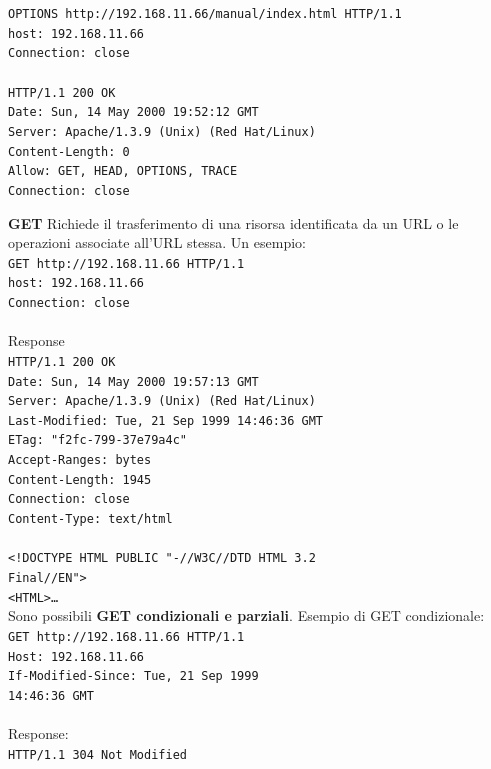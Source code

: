 \documentclass[10pt]{article}
\begin{document}
\begin{list}{}{}
\begin{list}{}{}
\begin{list}{}{(Alcuni) metodi request:}
\texttt{OPTIONS http://192.168.11.66/manual/index.html HTTP/1.1\\host: 192.168.11.66\\
Connection: close\\\\
HTTP/1.1 200 OK\\
Date: Sun, 14 May 2000 19:52:12 GMT\\
Server: Apache/1.3.9 (Unix) (Red Hat/Linux)\\
Content-Length: 0\\
Allow: GET, HEAD, OPTIONS, TRACE\\
Connection: close\\}
\item \textbf{GET} Richiede il trasferimento di una risorsa identificata da un URL o le operazioni associate all'URL stessa. Un esempio:\\
\texttt{GET http://192.168.11.66 HTTP/1.1\\
host: 192.168.11.66\\
Connection: close}\\\\
Response\\
\texttt{HTTP/1.1 200 OK\\
Date: Sun, 14 May 2000 19:57:13 GMT\\
Server: Apache/1.3.9 (Unix) (Red Hat/Linux)\\
Last-Modified: Tue, 21 Sep 1999 14:46:36 GMT\\
ETag: "f2fc-799-37e79a4c"\\
Accept-Ranges: bytes\\
Content-Length: 1945\\
Connection: close\\
Content-Type: text/html\\\\
<!DOCTYPE HTML PUBLIC "-//W3C//DTD HTML 3.2\\
Final//EN">\\
<HTML>\ldots\\}
Sono possibili \textbf{GET condizionali e parziali}. Esempio di GET condizionale:\\
\texttt{GET http://192.168.11.66 HTTP/1.1\\
Host: 192.168.11.66\\
If-Modified-Since: Tue, 21 Sep 1999\\
14:46:36 GMT}\\\\
Response:\\
\texttt{HTTP/1.1 304 Not Modified\\
}
\end{list}
\end{list}
\end{list}
\end{document}
